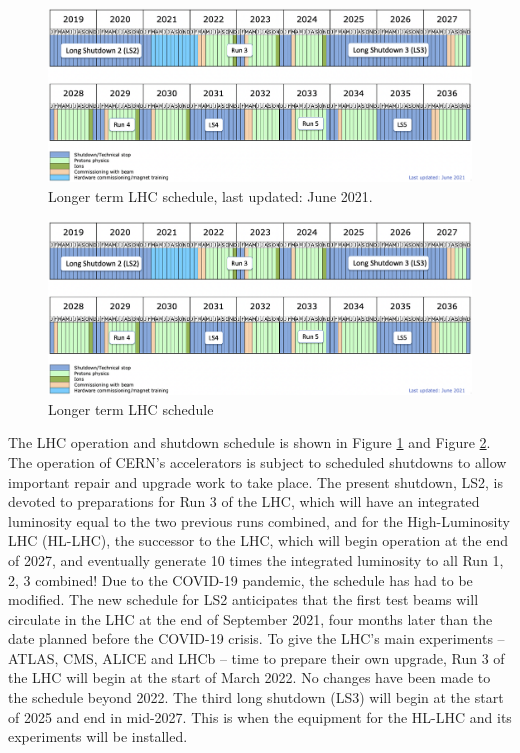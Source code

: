 \documentclass[letterpaper,12pt]{article}
\begin{document}
	\begin{figure}[]
		\begin{centering}	
		\includegraphics[width=.4\textwidth]{Detector_plots/LHC-longterm-schedule.png}
		\caption{Longer term LHC schedule, last updated: June 2021.%
			}
		\label{fig:LHC-longterm-schedule}
		\end{centering}
	\end{figure}
	\begin{figure}[]
		\begin{centering}	
		\includegraphics[width=.4\textwidth]{Detector_plots/LHC-longterm-schedule.png}
		\caption{Longer term LHC schedule %
			}
		\label{fig:LHC-schedule-lumi}
		\end{centering}
	\end{figure}
	The LHC operation and shutdown schedule is shown in Figure 
	\ref{fig:LHC-longterm-schedule}
	and Figure \ref{fig:LHC-schedule-lumi}.
	The operation of CERN’s accelerators is subject to scheduled shutdowns 
	to allow important repair and upgrade work to take place. 
	The present shutdown, LS2, is devoted to preparations for Run 3 of the LHC, 
	which will have an integrated luminosity equal to the two previous runs combined, 
	and for the High-Luminosity LHC (HL-LHC), 
	the successor to the LHC, which will begin operation at the end of 2027,
	and eventually generate 10 times the integrated luminosity to
	all Run 1, 2, 3 combined!
	Due to the COVID-19 pandemic, 
	the schedule has had to be modified. The new schedule for LS2 
	anticipates that the first test beams will circulate in the LHC 
	at the end of September 2021, four months later than the date 
	planned before the COVID-19 crisis. 
	To give the LHC’s main experiments – ATLAS, CMS, ALICE and LHCb – 
	time to prepare their own upgrade, 
	Run 3 of the LHC will begin at the start of March 2022.
	No changes have been made to the schedule beyond 2022.
	The third long shutdown (LS3) will begin at the 
	start of 2025 and end in mid-2027. 
	This is when the equipment for the HL-LHC and 
	its experiments will be installed. 
	
\end{document}
